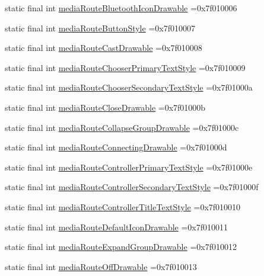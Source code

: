 \begin{DoxyCompactItemize}
static final int \hyperlink{classproject4_1_1xaria_1_1R_1_1attr_a78e3f143d8efbd225e623dd437d6bca7}{media\+Route\+Bluetooth\+Icon\+Drawable} =0x7f010006
\item 
static final int \hyperlink{classproject4_1_1xaria_1_1R_1_1attr_af6698191c0de933a1292ed46beeff80f}{media\+Route\+Button\+Style} =0x7f010007
\item 
static final int \hyperlink{classproject4_1_1xaria_1_1R_1_1attr_a6da0a32cd526b2860fa1958cbf1ba5bf}{media\+Route\+Cast\+Drawable} =0x7f010008
\item 
static final int \hyperlink{classproject4_1_1xaria_1_1R_1_1attr_a36e25c76355742fe46aa116ec008a0df}{media\+Route\+Chooser\+Primary\+Text\+Style} =0x7f010009
\item 
static final int \hyperlink{classproject4_1_1xaria_1_1R_1_1attr_a840a493887bf37bc6a26bd025b0e8cca}{media\+Route\+Chooser\+Secondary\+Text\+Style} =0x7f01000a
\item 
static final int \hyperlink{classproject4_1_1xaria_1_1R_1_1attr_a99f47f1840b6f949e05eed8bee125f0f}{media\+Route\+Close\+Drawable} =0x7f01000b
\item 
static final int \hyperlink{classproject4_1_1xaria_1_1R_1_1attr_afe4637aa896f5d10b0e2d8a3e198dab6}{media\+Route\+Collapse\+Group\+Drawable} =0x7f01000c
\item 
static final int \hyperlink{classproject4_1_1xaria_1_1R_1_1attr_a84d858b46985049420719c7443b37232}{media\+Route\+Connecting\+Drawable} =0x7f01000d
\item 
static final int \hyperlink{classproject4_1_1xaria_1_1R_1_1attr_af44b48cfd859fcf3c41599b050a6fe0d}{media\+Route\+Controller\+Primary\+Text\+Style} =0x7f01000e
\item 
static final int \hyperlink{classproject4_1_1xaria_1_1R_1_1attr_a9427a0abc269615286c5239596b2da35}{media\+Route\+Controller\+Secondary\+Text\+Style} =0x7f01000f
\item 
static final int \hyperlink{classproject4_1_1xaria_1_1R_1_1attr_a719833c01efa7bf01b60ca4f7e48aefe}{media\+Route\+Controller\+Title\+Text\+Style} =0x7f010010
\item 
static final int \hyperlink{classproject4_1_1xaria_1_1R_1_1attr_adf28f393e06ae14ea42e285b76f9f1a3}{media\+Route\+Default\+Icon\+Drawable} =0x7f010011
\item 
static final int \hyperlink{classproject4_1_1xaria_1_1R_1_1attr_ad00dd114a011b451410b5601485eb4c5}{media\+Route\+Expand\+Group\+Drawable} =0x7f010012
\item 
static final int \hyperlink{classproject4_1_1xaria_1_1R_1_1attr_a143f2e85eb078f3c310985128ac6907d}{media\+Route\+Off\+Drawable} =0x7f010013

\end{DoxyCompactItemize}
